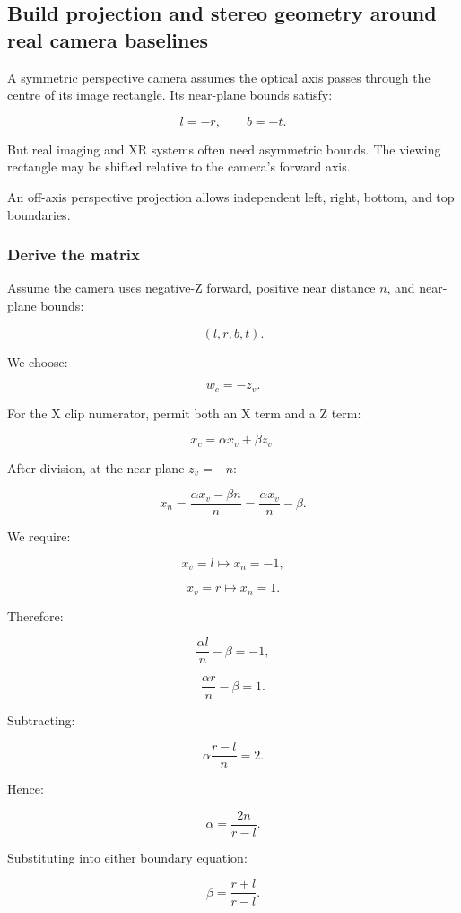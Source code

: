 \subsection{Build projection and stereo geometry around real camera baselines}\label{build-projection-and-stereo-geometry-around-real-camera-baselines}

A symmetric perspective camera assumes the optical axis passes through the centre of its image rectangle. Its near-plane bounds satisfy:

\[ l=-r,\qquad b=-t. \]

But real imaging and XR systems often need asymmetric bounds. The viewing rectangle may be shifted relative to the camera's forward axis.

An off-axis perspective projection allows independent left, right, bottom, and top boundaries.

\subsubsection{Derive the matrix}\label{derive-the-matrix}

Assume the camera uses negative-Z forward, positive near distance \(n\), and near-plane bounds:

\[ (l,r,b,t). \]

We choose:

\[ w_c=-z_v. \]

For the X clip numerator, permit both an X term and a Z term:

\[ x_c=\alpha x_v+\beta z_v. \]

After division, at the near plane \(z_v=-n\):

\[ x_n=\frac{\alpha x_v-\beta n}{n} =\frac{\alpha x_v}{n}-\beta. \]

We require:

\[ x_v=l\longmapsto x_n=-1, \]

\[ x_v=r\longmapsto x_n=1. \]

Therefore:

\[ \frac{\alpha l}{n}-\beta=-1, \]

\[ \frac{\alpha r}{n}-\beta=1. \]

Subtracting:

\[ \alpha\frac{r-l}{n}=2. \]

Hence:

\[ \boxed{\alpha=\frac{2n}{r-l}}. \]

Substituting into either boundary equation:

\[ \boxed{\beta=\frac{r+l}{r-l}}. \]

